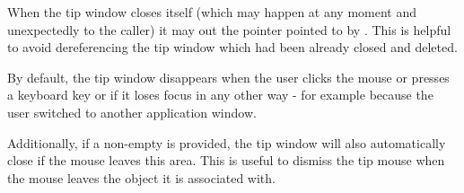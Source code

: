 \label{wxtipwindowsettipwindowptr}


When the tip window closes itself (which may happen at any moment and
unexpectedly to the caller) it may \NULL out the pointer pointed to by 
. This is helpful to avoid dereferencing the tip window which
had been already closed and deleted.



\label{wxtipwindowsetboundingrect}


By default, the tip window disappears when the user clicks the mouse or presses
a keyboard key or if it loses focus in any other way - for example because the
user switched to another application window.

Additionally, if a non-empty  is provided, the tip window will
also automatically close if the mouse leaves this area. This is useful to
dismiss the tip mouse when the mouse leaves the object it is associated with.



